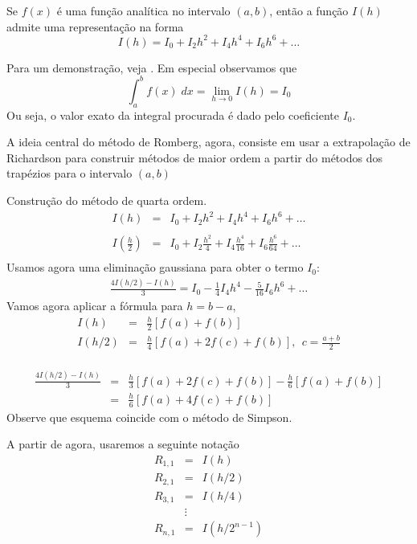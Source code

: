 \begin{teo} Se $f(x)$ é uma função analítica no intervalo $(a,b)$, então a função $I(h)$ admite uma representação na forma
$$I(h)=I_0 + I_2 h^2 + I_4{h^4}+ I_6{h^6}+\ldots$$
\end{teo}
Para um demonstração, veja \cite{DEMAILLY}. Em especial observamos que
$$\int_a^b f(x)\;dx = \lim_{h\to 0}I(h)=I_0$$
Ou seja, o valor exato da integral procurada é dado pelo coeficiente $I_0$.

A ideia central do método de Romberg, agora, consiste em usar a extrapolação de Richardson para construir métodos de maior ordem a partir do métodos dos trapézios para o intervalo $(a,b)$
\begin{ex} \label{exemplo_romberg_1}Construção do método de quarta ordem.
\begin{eqnarray*}
I(h)&=&I_0 + I_2 h^2 + I_4{h^4}+ I_6{h^6}+\ldots\\~\\
I\left(\frac{h}{2}\right)&=&I_0 + I_2 \frac{h^2}{4} + I_4\frac{h^4}{16}+ I_6\frac{h^6}{64}+\ldots\\
\end{eqnarray*}
Usamos agora uma eliminação gaussiana para obter o termo $I_0$:
\begin{eqnarray*}
\frac{4I(h/2)-I(h)}{3}=I_0-\frac{1}{4}I_4h^4-\frac{5}{16}I_6h^6+\ldots
\end{eqnarray*}
Vamos agora aplicar a fórmula para $h=b-a$,
\begin{eqnarray*}
I(h)&=& \frac{h}{2} \left[f(a)+f(b)\right]\\
I(h/2)&=& \frac{h}{4} \left[f(a)+2f\left(c\right)+f(b)\right],~~ c=\frac{a+b}{2}\\
\end{eqnarray*}

\begin{eqnarray*}
\frac{4I(h/2)-I(h)}{3}&=&\frac{h}{3}\left[f(a)+2f\left(c\right)+f(b)\right]-\frac{h}{6} \left[f(a)+f(b)\right]\\
&=&\frac{h}{6}\left[f(a)+4f\left(c\right)+f(b)\right]
\end{eqnarray*}
Observe que esquema coincide com o método de Simpson.
\end{ex}

A partir de agora, usaremos a seguinte notação
\begin{eqnarray*}
R_{1,1}&=&I(h)\\
R_{2,1}&=&I(h/2)\\
R_{3,1}&=&I(h/4)\\
&\vdots&\\
R_{n,1}&=&I(h/2^{n-1})
\end{eqnarray*}

